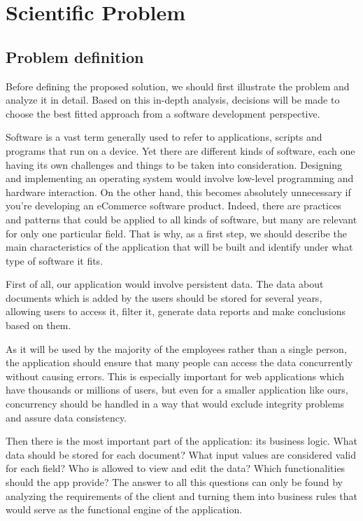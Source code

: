 \chapter{Scientific Problem}
\label{section:scientificProblem}



\section{Problem definition}
\label{section:problemDefinition}

Before defining the proposed solution, we should first illustrate the problem and analyze it in detail. Based on this in-depth analysis, decisions will be made to choose the best fitted approach from a software development perspective.

Software is a vast term generally used to refer to applications, scripts and programs that run on a device. Yet there are different kinds of software, each one having its own challenges and things to be taken into consideration. Designing and implementing an operating system would involve low-level programming and hardware interaction. On the other hand, this becomes absolutely unnecessary if you're developing an eCommerce software product. Indeed, there are practices and patterns that could be applied to all kinds of software, but many are relevant for only one particular field. That is why, as a first step, we should describe the main characteristics of the application that will be built and identify under what type of software it fits.

First of all, our application would involve persistent data. The data about documents which is added by the users should be stored for several years, allowing users to access it, filter it, generate data reports and make conclusions based on them.

As it will be used by the majority of the employees rather than a single person, the application should ensure that many people can access the data concurrently without causing errors. This is especially important for web applications which have thousands or millions of users, but even for a smaller application like ours, concurrency should be handled in a way that would exclude integrity problems and assure data consistency.

Then there is the most important part of the application: its business logic. What data should be stored for each document? What input values are considered valid for each field? Who is allowed to view and edit the data? Which functionalities should the app provide? The answer to all this questions can only be found by analyzing the requirements of the client and turning them into business rules that would serve as the functional engine of the application.

